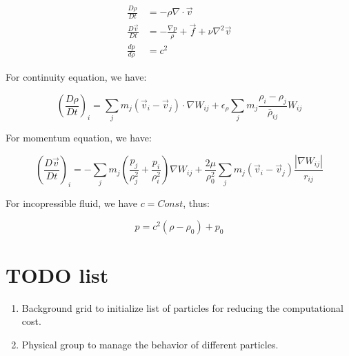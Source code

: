 \documentclass[10pt, oneside]{article}
\begin{document}
\begin{equation}
    \begin{aligned}
        \frac{D\rho}{Dt} &= -\rho \nabla \cdot \vec{v}\\
        \frac{D\vec{v}}{Dt} &= -\frac{\nabla p}{\rho} + \vec{f} + \nu \nabla^2 \vec{v}\\
        \frac{dp}{d\rho} &= c^2
    \end{aligned}
\end{equation}

For continuity equation, we have:

\begin{equation}
    \left(
        \frac{D\rho}{Dt}
    \right)_i = \sum_j m_j (\vec{v}_i-\vec{v}_j)\cdot \nabla W_{ij}
    +\epsilon_\rho \sum_j m_j \frac{\rho_i-\rho_j}{\bar{\rho}_{ij}}W_{ij}
\end{equation}

For momentum equation, we have:

\begin{equation}
    \left(
        \frac{D\vec{v}}{Dt}
    \right)_i=
    -\sum_j m_j \left(
        \frac{p_j}{\rho_j^2}+\frac{p_i}{\rho_i^2}
    \right)\nabla W_{ij}
    +\frac{2\mu}{\rho_0^2}
    \sum_j m_j (\vec{v}_i-\vec{v}_j)\frac{|\nabla W_{ij}|}{r_{ij}}
\end{equation}

For incopressible fluid, we have $c=Const$, thus:

\begin{equation}
    p = c^2(\rho - \rho_0) + p_0
\end{equation}

\section{TODO list}

\begin{enumerate}
    \item Background grid to initialize list of particles for reducing the computational cost.
    \item Physical group to manage the behavior of different particles.
\end{enumerate}
\end{document}
